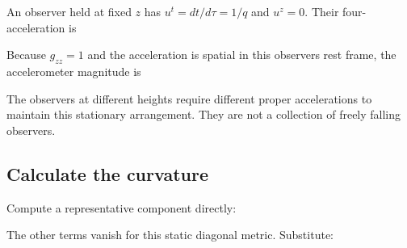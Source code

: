 \documentclass[
  11pt,
  letterpaper,
  oneside,
  openany]{scrbook}
\begin{document}
An observer held at fixed \(z\) has \(u^t=dt/d\tau=1/q\) and \(u^z=0\).
Their four-acceleration is

\begin{center}
\begingroup
{}
\ifdim\wd\grmathbox>\linewidth
\resizebox{\linewidth}{!}{\usebox{\grmathbox}}
\else\usebox{\grmathbox}\fi
\endgroup
\end{center}

Because \(g_{zz}=1\) and the acceleration is spatial in this
observer\textquotesingle s rest frame, the accelerometer magnitude is

\begin{center}
\begingroup
{}
\ifdim\wd\grmathbox>\linewidth
\resizebox{\linewidth}{!}{\usebox{\grmathbox}}
\else\usebox{\grmathbox}\fi
\endgroup
\end{center}

The observers at different heights require different proper
accelerations to maintain this stationary arrangement. They are not a
collection of freely falling observers.

\hypertarget{calculate-the-curvature}{%
\subsection{Calculate the curvature}\label{calculate-the-curvature}}

Compute a representative component directly:

\begin{center}
\begingroup
{}
\ifdim\wd\grmathbox>\linewidth
\resizebox{\linewidth}{!}{\usebox{\grmathbox}}
\else\usebox{\grmathbox}\fi
\endgroup
\end{center}

The other terms vanish for this static diagonal metric. Substitute:

\begin{center}
\begingroup
{}
\ifdim\wd\grmathbox>\linewidth
\resizebox{\linewidth}{!}{\usebox{\grmathbox}}
\else\usebox{\grmathbox}\fi
\endgroup
\end{center}
\end{document}
